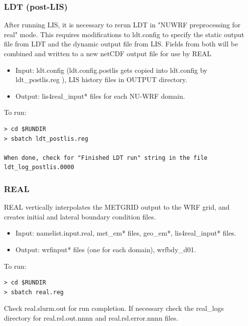 \begin{frame}[fragile]\frametitle{LDT (post-LIS)}

\footnotesize{
After running LIS, it is necessary to rerun LDT in "NUWRF preprocessing for real" mode. This requires modifications to ldt.config to specify the static output file from LDT and the dynamic output file from LIS. Fields from both will be combined and written to a new netCDF output file for use by REAL
\begin{itemize}
\item Input: ldt.config (ldt.config.postlis gets copied into ldt.config by ldt\_postlis.reg ), LIS history files in OUTPUT directory.
\item Output: lis4real\_input* files for each NU-WRF domain.
\end{itemize}
}    
\hrulefill\par
\footnotesize{To run:}
\begin{lstlisting}
> cd $RUNDIR
> sbatch ldt_postlis.reg

When done, check for "Finished LDT run" string in the file ldt_log_postlis.0000
\end{lstlisting}

\end{frame}


\begin{frame}[fragile]\frametitle{REAL}

\footnotesize{
\hrulefill\par       
REAL vertically interpolates the METGRID output to the WRF grid, and creates initial and lateral boundary condition files.
\begin{itemize}
\item Input: namelist.input.real, met\_em*  files, geo\_em*, lis4real\_input* files.
\item Output: wrfinput* files (one for each domain), wrfbdy\_d01.
\end{itemize}
}    
\hrulefill\par
\footnotesize{To run:}
\begin{lstlisting}
> cd $RUNDIR
> sbatch real.reg
\end{lstlisting}
Check real.slurm.out for run completion.
If necessary check the real\_logs directory for real.rsl.out.nnnn and real.rsl.error.nnnn files.


\end{frame}

